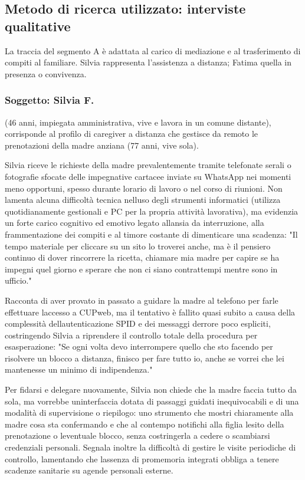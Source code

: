 \subsection[Interviste qualitative]{Metodo di ricerca utilizzato: interviste qualitative}

La traccia del segmento A è adattata al carico di
mediazione e al trasferimento di compiti al familiare. Silvia rappresenta
l'assistenza a distanza; Fatima quella in presenza o convivenza.

\subsubsection{Soggetto: Silvia F.}
\noindent (46 anni, impiegata amministrativa, vive e lavora in un comune distante), corrisponde al profilo di caregiver a distanza che gestisce da remoto le prenotazioni della madre anziana (77 anni, vive sola).

Silvia riceve le richieste della madre prevalentemente tramite telefonate serali o fotografie sfocate delle impegnative cartacee inviate su WhatsApp nei momenti meno opportuni, spesso durante l\textquotesingle orario di lavoro o nel corso di riunioni. Non lamenta alcuna difficoltà tecnica nell\textquotesingle uso degli strumenti informatici (utilizza quotidianamente gestionali e PC per la propria attività lavorativa), ma evidenzia un forte carico cognitivo ed emotivo legato all\textquotesingle ansia da interruzione, alla frammentazione dei compiti e al timore costante di dimenticare una scadenza: "Il tempo materiale per cliccare su un sito lo troverei anche, ma è il pensiero continuo di dover rincorrere la ricetta, chiamare mia madre per capire se ha impegni quel giorno e sperare che non ci siano contrattempi mentre sono in ufficio."

Racconta di aver provato in passato a guidare la madre al telefono per farle effettuare l\textquotesingle accesso a CUPweb, ma il tentativo è fallito quasi subito a causa della complessità dell\textquotesingle autenticazione SPID e dei messaggi d\textquotesingle errore poco espliciti, costringendo Silvia a riprendere il controllo totale della procedura per esasperazione: "Se ogni volta devo interrompere quello che sto facendo per risolvere un blocco a distanza, finisco per fare tutto io, anche se vorrei che lei mantenesse un minimo di indipendenza."

Per fidarsi e delegare nuovamente, Silvia non chiede che la madre faccia tutto da sola, ma vorrebbe un\textquotesingle interfaccia dotata di passaggi guidati inequivocabili e di una modalità di supervisione o riepilogo: uno strumento che mostri chiaramente alla madre cosa sta confermando e che al contempo notifichi alla figlia l\textquotesingle esito della prenotazione o l\textquotesingle eventuale blocco, senza costringerla a cedere o scambiarsi credenziali personali. Segnala inoltre la difficoltà di gestire le visite periodiche di controllo, lamentando che l\textquotesingle assenza di promemoria integrati obbliga a tenere scadenze sanitarie su agende personali esterne.

